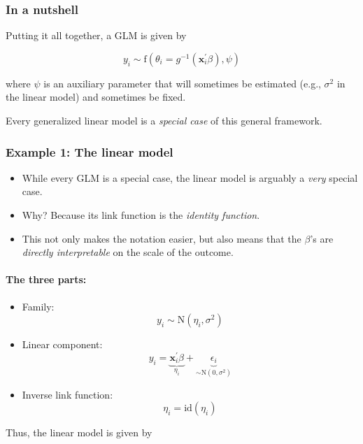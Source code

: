 \documentclass[
  11pt,
]{article}
\providecommand{\tightlist}{%
  \setlength{\itemsep}{0pt}\setlength{\parskip}{0pt}}
\begin{document}
\hypertarget{in-a-nutshell}{%
\subsubsection{In a nutshell}\label{in-a-nutshell}}

Putting it all together, a GLM is given by

\[y_i \sim \text{f}(\theta_i = g^{-1}(\mathbf{x}_i^{\prime} \beta), \psi)\]

where \(\psi\) is an auxiliary parameter that will sometimes be estimated (e.g., \(\sigma^2\) in the linear model) and sometimes be fixed.

Every generalized linear model is a \emph{special case} of this general framework.

\hypertarget{example-1-the-linear-model}{%
\subsubsection{Example 1: The linear model}\label{example-1-the-linear-model}}

\begin{itemize}
\tightlist
\item
  While every GLM is a special case, the linear model is arguably a \emph{very} special case.
\item
  Why? Because its link function is the \emph{identity function}.
\item
  This not only makes the notation easier, but also means that the \(\beta\)'s are \emph{directly interpretable} on the scale of the outcome.
\end{itemize}

\hypertarget{the-three-parts}{%
\paragraph{The three parts:}\label{the-three-parts}}

\begin{itemize}
\tightlist
\item
  Family: \[y_i \sim \text{N}(\eta_i, \sigma^2)\]
\item
  Linear component: \[y_i = \underbrace{\mathbf{x}_i^{\prime} \beta}_{\eta_i} + \underbrace{\epsilon_i}_{\sim \text{N}(0, \sigma^2)}\]
\item
  Inverse link function: \[\eta_i = \text{id}(\eta_i)\]
\end{itemize}

Thus, the linear model is given by
\end{document}
